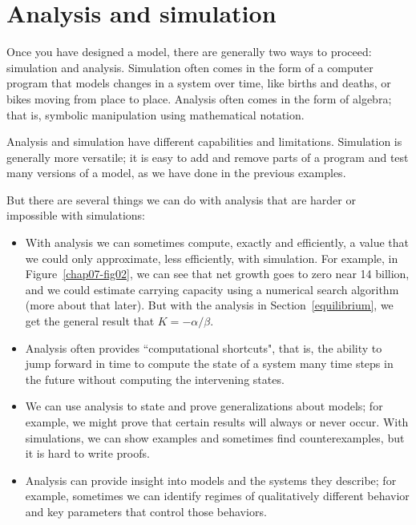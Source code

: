 \documentclass[12pt]{book}
\theoremstyle{exercise}
\begin{document}
\section{Analysis and simulation}

Once you have designed a model, there are generally two ways to proceed: simulation and analysis.  Simulation often comes in the form of a computer program that models changes in a system over time, like births and deaths, or bikes moving from place to place.  Analysis often comes in the form of algebra; that is, symbolic manipulation using mathematical notation.


Analysis and simulation have different capabilities and limitations.  Simulation is generally more versatile; it is easy to add and remove parts of a program and test many versions of a model, as we have done in the previous examples.

But there are several things we can do with analysis that are harder or impossible with simulations:

\begin{itemize}

\item With analysis we can sometimes compute, exactly and efficiently, a value that we could only approximate, less efficiently, with simulation.  For example, in Figure~\ref{chap07-fig02}, we can see that net growth goes to zero near 14 billion, and we could estimate carrying capacity using a numerical search algorithm (more about that later).  But with the analysis in Section~\ref{equilibrium}, we get the general result that $K=-\alpha/\beta$.

\item Analysis often provides ``computational shortcuts", that is, the ability to jump forward in time to compute the state of a system many time steps in the future without computing the intervening states.


\item We can use analysis to state and prove generalizations about models; for example, we might prove that certain results will always or never occur.  With simulations, we can show examples and sometimes find counterexamples, but it is hard to write proofs.


\item Analysis can provide insight into models and the systems they describe; for example, sometimes we can identify regimes of qualitatively different behavior and key parameters that control those behaviors.


\end{itemize}
\end{document}
